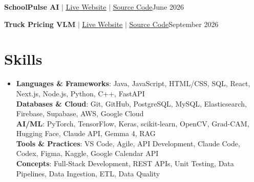 \documentclass[letterpaper,10pt]{article}
\begin{document}
    \resumeProjectHeading
      {\textbf{SchoolPulse AI} $|$ \href{https://school-pulse-ai.vercel.app/}{\underline{Live Website}} $|$ \href{https://github.com/vignesh-nagarajan-vn/SchoolPulse-AI}{\underline{Source Code}}}{June 2026}
      \resumeItemListStart
      \resumeItemListEnd

    \resumeProjectHeading
      {\textbf{Truck Pricing VLM} $|$ \href{https://truck-pricing-vlm.vercel.app/}{\underline{Live Website}} $|$ \href{https://github.com/Raghavsk24/Truck-Pricing-VLM}{\underline{Source Code}}}{September 2026}
      \resumeItemListStart
      \resumeItemListEnd

  \resumeSubHeadingListEnd


\section{Skills}
 \begin{itemize}[leftmargin=0.15in, label={}]
    \item{
     \textbf{Languages \& Frameworks}{: Java, JavaScript, HTML/CSS, SQL, React, Next.js, Node.js, Python, C++, FastAPI} \\
     \textbf{Databases \& Cloud}{: Git, GitHub, PostgreSQL, MySQL, Elasticsearch, Firebase, Supabase, AWS, Google Cloud} \\
     \textbf{AI/ML}{: PyTorch, TensorFlow, Keras, scikit-learn, OpenCV, Grad-CAM, Hugging Face, Claude API, Gemma 4, RAG} \\
     \textbf{Tools \& Practices}{: VS Code, Agile, API Development, Claude Code, Codex, Figma, Kaggle, Google Calendar API} \\
     \textbf{Concepts}{: Full-Stack Development, REST APIs, Unit Testing, Data Pipelines, Data Ingestion, ETL, Data Quality}
    }
 \end{itemize}
 \vspace{3.53pt}

\end{document}
